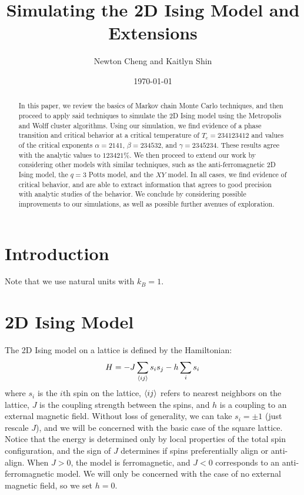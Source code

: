 \documentclass[twocolumn,aps,prl]{revtex4-1} %
\begin{document}
\title{Simulating the 2D Ising Model and Extensions}

\author{Newton Cheng and Kaitlyn Shin}

\date{\today}
\begin{abstract}
In this paper, we review the basics of Markov chain Monte Carlo techniques, and then proceed to apply said techniques to simulate the 2D Ising model using the Metropolis and Wolff cluster algorithms. Using our simulation, we find evidence of a phase transition and critical behavior at a critical temperature of $T_c = 234123412$ and values of the critical exponents $\alpha = 2141$, $\beta = 234532$, and $\gamma = 2345234$. These results agree with the analytic values to $123421\%$. We then proceed to extend our work by considering other models with similar techniques, such as the anti-ferromagnetic 2D Ising model, the $q = 3$ Potts model, and the $XY$ model. In all cases, we find evidence of critical behavior, and are able to extract information that agrees to good precision with analytic studies of the behavior. We conclude by considering possible improvements to our simulations, as well as possible further avenues of exploration.
\end{abstract}

\maketitle
\section{Introduction}
Note that we use natural units with $k_B = 1$. 
\section{2D Ising Model}
The 2D Ising model on a lattice is defined by the Hamiltonian:
\begin{equation}
H = -J\sum_{\braket{ij}}s_is_j - h\sum_i s_i
\end{equation}
where $s_i$ is the $i$th spin on the lattice, $\braket{ij}$ refers to nearest neighbors on the lattice, $J$ is the coupling strength between the spins, and $h$ is a coupling to an external magnetic field. Without loss of generality, we can take $s_i = \pm 1$ (just rescale $J$), and we will be concerned with the basic case of the square lattice. Notice that the energy is determined only by local properties of the total spin configuration, and the sign of $J$ determines if spins preferentially align or anti-align. When $J > 0$, the model is ferromagnetic, and $J < 0$ corresponds to an anti-ferromagnetic model. We will only be concerned with the case of no external magnetic field, so we set $h = 0$. 
\end{document}
